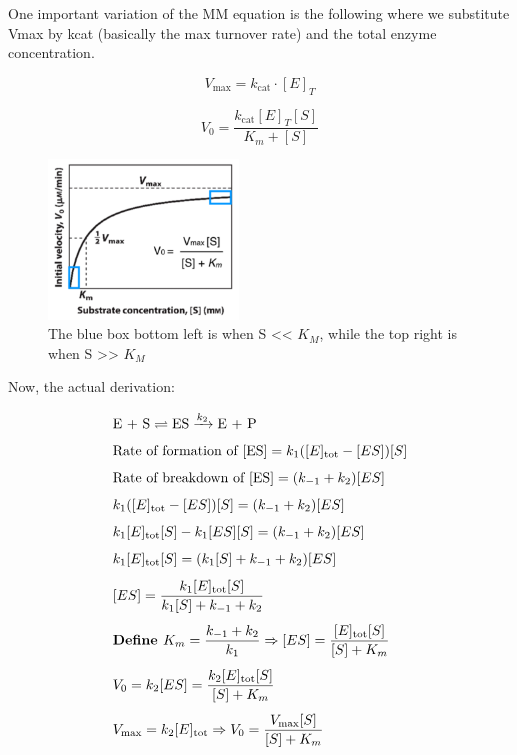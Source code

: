 \documentclass[../main.tex]{subfiles}
\begin{document}
One important variation of the MM equation is the following where we substitute Vmax by kcat (basically the max turnover rate) and the total enzyme concentration.

\begin{equation}
	V_{\max} = k_{\text{cat}} \cdot [E]_T
\end{equation}

\begin{equation}
	V_{0} = \frac{k_{\text{cat}} [E]_T [S]}{K_m + [S]}
\end{equation}

\begin{figure}[h]
	\centering
	\includegraphics[width=0.45\textwidth]{MM}
	\caption{The blue box bottom left is when S << $K_{M}$, while the top right is when S >> $K_{M}$}
\end{figure}

Now, the actual derivation:

\begin{align*}
	&\text{E + S} \rightleftharpoons \text{ES} \xrightarrow{k_2} \text{E + P} \\[1ex]
	&\text{Rate of formation of [ES]} = k_1([E]_{\text{tot}} - [ES])[S] \\[1ex]
	&\text{Rate of breakdown of [ES]} = (k_{-1} + k_2)[ES] \\[1ex]
	&k_1([E]_{\text{tot}} - [ES])[S] = (k_{-1} + k_2)[ES] \\[1ex]
	&k_1[E]_{\text{tot}}[S] - k_1[ES][S] = (k_{-1} + k_2)[ES] \\[1ex]
	&k_1[E]_{\text{tot}}[S] = (k_1[S] + k_{-1} + k_2)[ES] \\[1ex]
	&[ES] = \frac{k_1[E]_{\text{tot}}[S]}{k_1[S] + k_{-1} + k_2} \\[1ex]
	&\text{\textbf{Define }} K_m = \frac{k_{-1} + k_2}{k_1} \Rightarrow [ES] = \frac{[E]_{\text{tot}}[S]}{[S] + K_m} \\[1ex]
	&V_0 = k_2[ES] = \frac{k_2[E]_{\text{tot}}[S]}{[S] + K_m} \\[1ex]
	&V_{\max} = k_2[E]_{\text{tot}} \Rightarrow V_0 = \frac{V_{\max}[S]}{[S] + K_m}
\end{align*}
\end{document}
